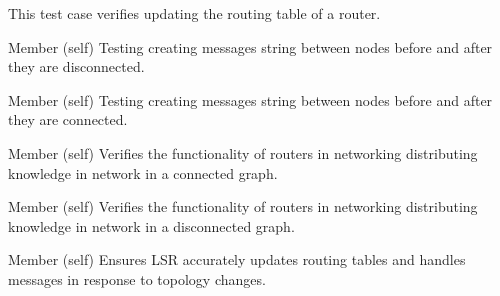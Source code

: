 \begin{DoxyRefList}
%
This test case verifies updating the routing table of a router.  
\item[Member \doxylink{classtest__lsr_1_1_test_link_state_a6d42d2727d56039c36804362eae924c6}{test\+\_\+lsr.Test\+Link\+State.test\+\_\+connected\+\_\+to\+\_\+disconnected} (self)]\label{test__test000017}%
%
Testing creating messages string between nodes before and after they are disconnected.  
\item[Member \doxylink{classtest__lsr_1_1_test_link_state_ad9b460b569a91ba63645f821f709ca60}{test\+\_\+lsr.Test\+Link\+State.test\+\_\+disconnected\+\_\+to\+\_\+connected\+\_\+messages} (self)]\label{test__test000016}%
%
Testing creating messages string between nodes before and after they are connected. ~\newline
  
\item[Member \doxylink{classtest__lsr_1_1_test_link_state_acc1029fbd255c96d65f96701131e5a2a}{test\+\_\+lsr.Test\+Link\+State.test\+\_\+distribute\+\_\+all\+\_\+lsp\+\_\+connected\+\_\+graph} (self)]\label{test__test000011}%
%
Verifies the functionality of routers in networking distributing knowledge in network in a connected graph.  
\item[Member \doxylink{classtest__lsr_1_1_test_link_state_acf459bf23da7df09de8cf1b8f5608cd8}{test\+\_\+lsr.Test\+Link\+State.test\+\_\+distribute\+\_\+all\+\_\+lsp\+\_\+disconnected\+\_\+graph} (self)]\label{test__test000012}%
%
Verifies the functionality of routers in networking distributing knowledge in network in a disconnected graph.  
\item[Member \doxylink{classtest__lsr_1_1_test_link_state_af093ce910b4be941ef7e10b96cd82e1b}{test\+\_\+lsr.Test\+Link\+State.test\+\_\+ls\+\_\+algorithm\+\_\+single\+\_\+router} (self)]\label{test__test000015}%
%
Ensures LSR accurately updates routing tables and handles messages in response to topology changes. ~\newline
  

\end{DoxyRefList}
